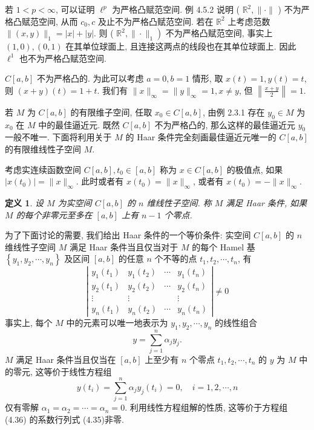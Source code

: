 \documentclass[openany]{ctexbook}
\theoremstyle{kaiti}
\newtheorem{definition}{定义}[section]
\theoremstyle{normal}
\begin{document}
若 $1<p<\infty$, 可以证明 $\ell^{p}$ 为严格凸赋范空间. 例 4.5.2 说明 ( $\mathbb{R}^2,\|\cdot\|$ ) 不为严格凸赋范空间, 从而 $c_0, c$ 及止不为严格凸赋范空间. 若在 $\mathbb{R}^2$ 上考虑范数$\|(x, y)\|_1=|x|+|y|$. 则 ( $\left.\mathbb{R}^2,\|\cdot\|_1\right)$ 不为严格凸赋范空间, 事实上 $(1,0),(0,1)$ 在其单位球面上, 且连接这两点的线段也在其单位球面上. 因此 $\ell^1$ 也不为严格凸赋范空间.

$C[a, b]$ 不为严格凸的. 为此可以考虑 $a=0, b=1$ 情形, 取 $x(t)=1, y(t)=t$, 则 $(x+y)(t)=1+t$. 我们有 $\|x\|_{\infty}=\|y\|_{\infty}=1, x \neq y$, 但 $\left\|\frac{x+y}{2}\right\|=1$.

若 $M$ 为 $C[a, b]$ 的有限维子空间, 任取 $x_0 \in C[a, b]$, 由例 2.3.1 存在 $y_0 \in M$ 为 $x_0$ 在 $M$ 中的最佳逼近元. 既然 $C[a, b]$ 不为严格凸的, 那么这样的最佳逼近元 $y_0$ 一般不唯一. 下面将利用关于 $M$ 的 Haar 条件完全刻画最佳逼近元唯一的 $C[a, b]$ 的有限维线性子空间 $M$.

考虑实连续函数空间 $C[a, b], t_0 \in[a, b]$ 称为 $x \in C[a, b]$ 的极值点, 如果 $\left|x\left(t_0\right)\right|=\|x\|_{\infty}$. 此时或者有 $x\left(t_0\right)=\|x\|_{\infty}$, 或者有 $x\left(t_0\right)=-\|x\|_{\infty}$.

\begin{definition}
设 $M$ 为实空间 $C[a, b]$ 的 $n$ 维线性子空间. 称 $M$ 满足 Haar 条件, 如果 $M$ 的每个非零元至多在 $[a, b]$ 上有 $n-1$ 个零点.
\end{definition}

为了下面讨论的需要, 我们给出 Haar 条件的一个等价条件: 实空间 $C[a, b]$ 的 $n$ 维线性子空间 $M$ 满足 Haar 条件当且仅当对于 $M$ 的每个 Hamel 基 $\left\{y_1, y_2, \cdots, y_n\right\}$ 及区间 $[a, b]$ 的任意 $n$ 个不等的点 $t_1, t_2, \cdots, t_n$, 有
\begin{equation}
  \left|\begin{array}{cccc}
    y_1\left(t_1\right) & y_1\left(t_2\right) & \cdots & y_1\left(t_n\right) \\
    y_2\left(t_1\right) & y_2\left(t_2\right) & \cdots & y_2\left(t_n\right) \\
    \vdots & \vdots & & \vdots \\
    y_n\left(t_1\right) & y_n\left(t_2\right) & \cdots & y_n\left(t_n\right)
  \end{array}\right| \neq 0
\end{equation}
事实上, 每个 $M$ 中的元素可以唯一地表示为 $y_1, y_2, \cdots, y_n$ 的线性组合
$$
y=\sum_{j=1}^n \alpha_{j} y_{j}.
$$
$M$ 满足 Haar 条件当且仅当在 $[a, b]$ 上至少有 $n$ 个零点 $t_1, t_2, \cdots, t_n$ 的 $y$ 为 $M$ 中的零元, 这等价于线性方程组
\begin{equation}
  y\left(t_{i}\right)=\sum_{j=1}^n \alpha_{j} y_{j}\left(t_{i}\right)=0, \quad i=1,2, \cdots, n
\end{equation}
仅有零解 $\alpha_1=\alpha_2=\cdots=\alpha_n=0$. 利用线性方程组解的性质, 这等价于方程组 (4.36) 的系数行列式 (4.35)非零.
\end{document}
